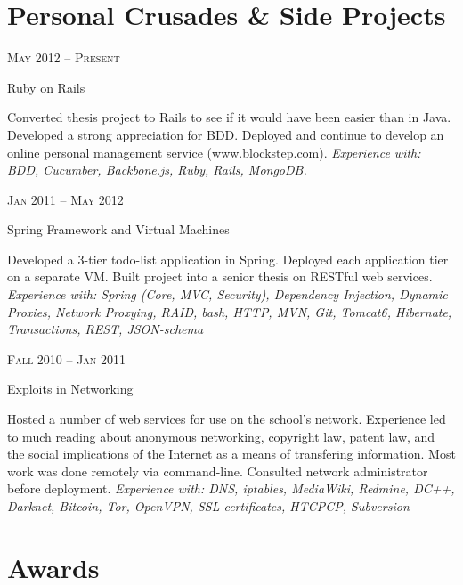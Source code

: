 \documentclass[10pt]{article} %
\begin{document}
{\begin{minipage}[t]{0.44\textwidth}
\section{Personal Crusades \& Side Projects} 


{\raggedleft\textsc{May 2012 -- Present}\par}
{\raggedright\large Ruby on Rails}

{\normalsize{ Converted thesis project to Rails to see if it would have been easier than in Java. Developed a strong appreciation for BDD. Deployed and continue to develop an online personal management service (www.blockstep.com).}
\textit{Experience with: BDD, Cucumber, Backbone.js, Ruby, Rails, MongoDB. }\\[5pt]}


{\raggedleft\textsc{Jan 2011 -- May 2012}\par}
{\raggedright\large Spring Framework and Virtual Machines }
{\normalsize{ Developed a 3-tier todo-list application in Spring. Deployed each application tier on a separate VM. Built project into a senior thesis on RESTful web services. }\\
\textit{Experience with: Spring (Core, MVC, Security), Dependency Injection, Dynamic Proxies, Network Proxying, RAID, bash, HTTP, MVN, Git, Tomcat6, Hibernate, Transactions, REST, JSON-schema } \\[6pt]}

{\raggedleft\textsc{Fall 2010 -- Jan 2011}\par}
{\raggedright\large Exploits in Networking }
{\normalsize{Hosted a number of web services for use on the school's network. Experience led to much reading about anonymous networking, copyright law, patent law, and the social implications of the Internet as a means of transfering information. Most work was done remotely via command-line. Consulted network administrator before deployment. }
\textit{Experience with: DNS, iptables, MediaWiki, Redmine, DC++, Darknet, Bitcoin, Tor, OpenVPN, SSL certificates, HTCPCP, Subversion } \\[5pt]}



\section{Awards} 


\end{minipage}}
\end{document}
